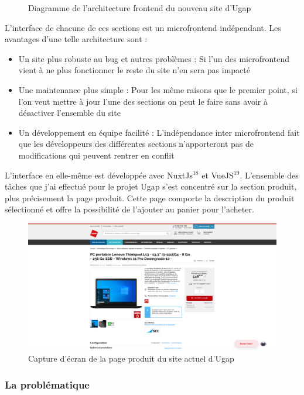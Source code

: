 \documentclass[12pt]{article}
\begin{document}
\begin {sloppypar}
\begin{figure}[h]
  \caption {Diagramme de l'architecture frontend du nouveau site d'Ugap}
\end{figure}
L'interface de chacune de ces sections est un microfrontend indépendant. Les avantages d'une telle 
architecture sont : 
\begin{itemize}
  \item 
    Un site plus robuste au bug et autres problèmes : Si l'un des microfrontend vient à ne plus 
    fonctionner le reste du site n'en sera pas impacté
  \item 
    Une maintenance plus simple : Pour les même raisons que le premier point, si l'on veut 
    mettre à jour l'une des sections on peut le faire sans avoir à désactiver l'ensemble du site 
  \item 
    Un développement en équipe facilité : L'indépendance inter microfrontend fait que les développeurs 
    des différentes sections n'apporteront pas de modifications qui peuvent rentrer en conflit
\end{itemize}
L'interface en elle-même est développée avec NuxtJs$^{18}$ et VueJS$^{19}$. L'ensemble des tâches 
que j'ai effectué pour le projet Ugap s'est concentré sur la section produit, plus précisement 
la page produit. Cette page comporte la description du produit sélectionné et offre la possibilité 
de l'ajouter au panier pour l'acheter.
\begin{figure}[h]
  \includegraphics[width=\textwidth] {sc_product-page.png}
  \caption {Capture d'écran de la page produit du site actuel d'Ugap}
\end{figure}
\newpage 
\subsubsection{La problématique}

\end{sloppypar}
\end{document}
